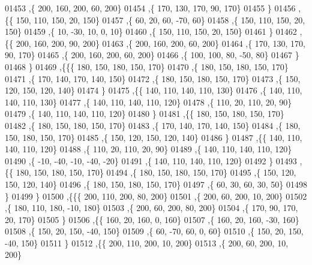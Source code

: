 \begin{DoxyCode}
01453     ,\{   200,   160,   200,    60,   200\}
01454     ,\{   170,   130,   170,    90,   170\}
01455     \}
01456    ,\{\{   150,   110,   150,    20,   150\}
01457     ,\{    60,    20,    60,   -70,    60\}
01458     ,\{   150,   110,   150,    20,   150\}
01459     ,\{    10,   -30,    10,     0,    10\}
01460     ,\{   150,   110,   150,    20,   150\}
01461     \}
01462    ,\{\{   200,   160,   200,    90,   200\}
01463     ,\{   200,   160,   200,    60,   200\}
01464     ,\{   170,   130,   170,    90,   170\}
01465     ,\{   200,   160,   200,    60,   200\}
01466     ,\{   100,   100,    80,   -50,    80\}
01467     \}
01468    \}
01469   ,\{\{\{   180,   150,   180,   150,   170\}
01470     ,\{   180,   150,   180,   150,   170\}
01471     ,\{   170,   140,   170,   140,   150\}
01472     ,\{   180,   150,   180,   150,   170\}
01473     ,\{   150,   120,   150,   120,   140\}
01474     \}
01475    ,\{\{   140,   110,   140,   110,   130\}
01476     ,\{   140,   110,   140,   110,   130\}
01477     ,\{   140,   110,   140,   110,   120\}
01478     ,\{   110,    20,   110,    20,    90\}
01479     ,\{   140,   110,   140,   110,   120\}
01480     \}
01481    ,\{\{   180,   150,   180,   150,   170\}
01482     ,\{   180,   150,   180,   150,   170\}
01483     ,\{   170,   140,   170,   140,   150\}
01484     ,\{   180,   150,   180,   150,   170\}
01485     ,\{   150,   120,   150,   120,   140\}
01486     \}
01487    ,\{\{   140,   110,   140,   110,   120\}
01488     ,\{   110,    20,   110,    20,    90\}
01489     ,\{   140,   110,   140,   110,   120\}
01490     ,\{   -10,   -40,   -10,   -40,   -20\}
01491     ,\{   140,   110,   140,   110,   120\}
01492     \}
01493    ,\{\{   180,   150,   180,   150,   170\}
01494     ,\{   180,   150,   180,   150,   170\}
01495     ,\{   150,   120,   150,   120,   140\}
01496     ,\{   180,   150,   180,   150,   170\}
01497     ,\{    60,    30,    60,    30,    50\}
01498     \}
01499    \}
01500   ,\{\{\{   200,   110,   200,    80,   200\}
01501     ,\{   200,    60,   200,    10,   200\}
01502     ,\{   180,   110,   180,   -10,   180\}
01503     ,\{   200,    60,   200,    80,   200\}
01504     ,\{   170,    90,   170,    20,   170\}
01505     \}
01506    ,\{\{   160,    20,   160,     0,   160\}
01507     ,\{   160,    20,   160,   -30,   160\}
01508     ,\{   150,    20,   150,   -40,   150\}
01509     ,\{    60,   -70,    60,     0,    60\}
01510     ,\{   150,    20,   150,   -40,   150\}
01511     \}
01512    ,\{\{   200,   110,   200,    10,   200\}
01513     ,\{   200,    60,   200,    10,   200\}

\end{DoxyCode}
